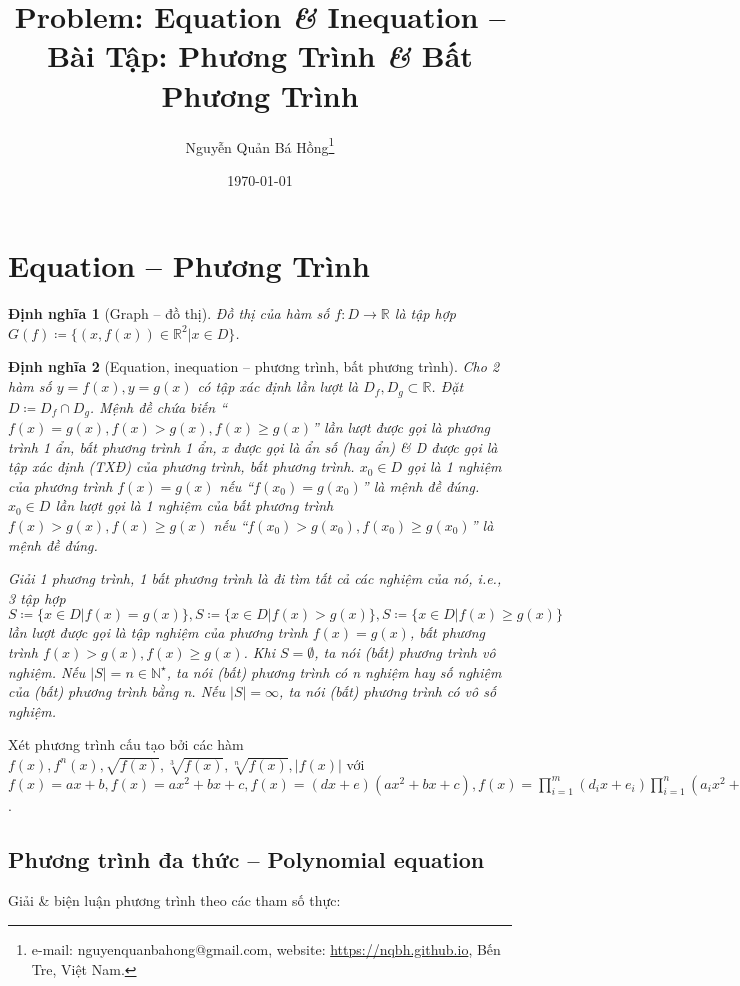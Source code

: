 \documentclass{article}
\title{Problem: Equation {\it\&} Inequation -- Bài Tập: Phương Trình {\it\&} Bất Phương Trình}
\author{Nguyễn Quản Bá Hồng\footnote{e-mail: {\sf nguyenquanbahong@gmail.com}, website: \url{https://nqbh.github.io}, Bến Tre, Việt Nam.}}
\date{\today}
\newtheorem{dinhnghia}{Định nghĩa}
\begin{document}
\maketitle
\tableofcontents


\section{Equation -- Phương Trình}

\begin{dinhnghia}[Graph -- đồ thị]
	{\rm Đồ thị} của hàm số $f:D\to\mathbb{R}$ là tập hợp $G(f)\coloneqq\{(x,f(x))\in\mathbb{R}^2|x\in D\}$.
\end{dinhnghia}

\begin{dinhnghia}[Equation, inequation -- phương trình, bất phương trình]
	Cho 2 hàm số $y = f(x),y = g(x)$ có tập xác định lần lượt là $D_f,D_g\subset\mathbb{R}$. Đặt $D\coloneqq D_f\cap D_g$. Mệnh đề chứa biến ``$f(x) = g(x),f(x) > g(x),f(x)\ge g(x)$'' lần lượt được gọi là {\rm phương trình 1 ẩn, bất phương trình 1 ẩn}, x được gọi là {\rm ẩn số} (hay {\rm ẩn}) \& D được gọi là {\rm tập xác định (TXĐ)} của phương trình, bất phương trình. $x_0\in D$ gọi là 1 {\rm nghiệm} của phương trình $f(x) = g(x)$ nếu ``$f(x_0) = g(x_0)$'' là mệnh đề đúng. $x_0\in D$ lần lượt gọi là 1 {\rm nghiệm} của bất phương trình $f(x) > g(x),f(x)\ge g(x)$ nếu ``$f(x_0) > g(x_0),f(x_0)\ge g(x_0)$'' là mệnh đề đúng.
	
	{\rm Giải} 1 phương trình, 1 bất phương trình là đi tìm tất cả các nghiệm của nó, i.e., 3 tập hợp $S\coloneqq\{x\in D|f(x) = g(x)\},S\coloneqq\{x\in D|f(x) > g(x)\},S\coloneqq\{x\in D|f(x)\ge g(x)\}$ lần lượt được gọi là {\rm tập nghiệm} của phương trình $f(x) = g(x)$, bất phương trình $f(x) > g(x),f(x)\ge g(x)$. Khi $S = \emptyset$, ta nói (bất) phương trình {\rm vô nghiệm}. Nếu $|S| = n\in\mathbb{N}^\star$, ta nói (bất) phương trình có n nghiệm hay số nghiệm của (bất) phương trình bằng n. Nếu $|S| = \infty$, ta nói (bất) phương trình có vô số nghiệm.
\end{dinhnghia}
Xét phương trình cấu tạo bởi các hàm $f(x),f^n(x),\sqrt{f(x)},\sqrt[3]{f(x)},\sqrt[n]{f(x)},|f(x)|$ với $f(x) = ax + b,f(x) = ax^2 + bx + c,f(x) = (dx + e)(ax^2 + bx + c),f(x) = \prod_{i=1}^m (d_ix + e_i)\prod_{i=1}^n (a_ix^2 + b_ix + c_i)$.

\subsection{Phương trình đa thức -- Polynomial equation}
Giải \& biện luận phương trình theo các tham số thực:
\end{document}
